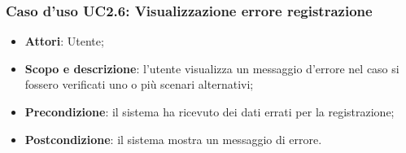 \subsubsection{Caso d'uso UC2.6: Visualizzazione errore registrazione}
\begin{itemize}
\item \textbf{Attori}: Utente;
\item \textbf{Scopo e descrizione}: l'utente visualizza un messaggio d'errore nel caso si fossero verificati uno o più scenari alternativi;
\item \textbf{Precondizione}: il sistema ha ricevuto dei dati errati per la registrazione;
\item \textbf{Postcondizione}: il sistema mostra un messaggio di errore.
\end{itemize}
